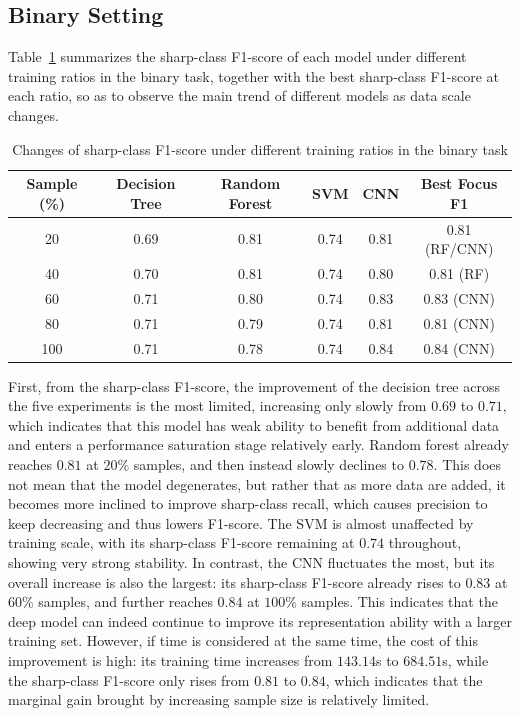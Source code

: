 \subsection{Binary Setting}
\par Table~\ref{tab:sample-binary-summary} summarizes the sharp-class F1-score
of each model under different training ratios in the binary task, together with
the best sharp-class F1-score at each ratio, so as to observe the main trend of
different models as data scale changes.

\begin{table}[htbp]
    \centering
    \caption{Changes of sharp-class F1-score under different training ratios in the binary task}
    \label{tab:sample-binary-summary}
    \begin{tabular}{cccccc}
        \toprule
        Sample (\%) & Decision Tree & Random Forest & SVM & CNN & Best Focus F1
        \\
        \midrule
        20  & 0.69 & 0.81 & 0.74 & 0.81 & 0.81 (RF/CNN) \\
        40  & 0.70 & 0.81 & 0.74 & 0.80 & 0.81 (RF) \\
        60  & 0.71 & 0.80 & 0.74 & 0.83 & 0.83 (CNN) \\
        80  & 0.71 & 0.79 & 0.74 & 0.81 & 0.81 (CNN) \\
        100 & 0.71 & 0.78 & 0.74 & 0.84 & 0.84 (CNN) \\
        \bottomrule
    \end{tabular}
\end{table}

\par First, from the sharp-class F1-score, the improvement of the decision tree
across the five experiments is the most limited, increasing only slowly from
$0.69$ to $0.71$, which indicates that this model has weak ability to benefit
from additional data and enters a performance saturation stage relatively
early. Random forest already reaches $0.81$ at $20\%$ samples, and then
instead slowly declines to $0.78$. This does not mean that the model
degenerates, but rather that as more data are added, it becomes more inclined
to improve sharp-class recall, which causes precision to keep decreasing and
thus lowers F1-score. The SVM is almost unaffected by training scale, with its
sharp-class F1-score remaining at $0.74$ throughout, showing very strong
stability. In contrast, the CNN fluctuates the most, but its overall increase
is also the largest: its sharp-class F1-score already rises to $0.83$ at
$60\%$ samples, and further reaches $0.84$ at $100\%$ samples. This indicates
that the deep model can indeed continue to improve its representation ability
with a larger training set. However, if time is considered at the same time,
the cost of this improvement is high: its training time increases from
$143.14$s to $684.51$s, while the sharp-class F1-score only rises from $0.81$
to $0.84$, which indicates that the marginal gain brought by increasing sample
size is relatively limited.

